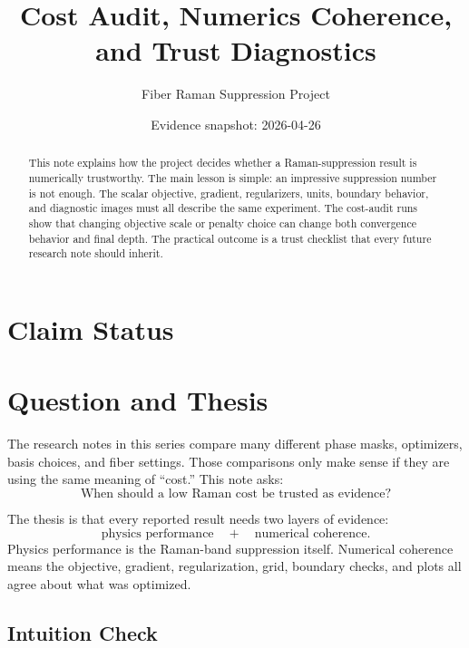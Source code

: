 \documentclass[11pt]{article}
\title{Cost Audit, Numerics Coherence, and Trust Diagnostics}
\author{Fiber Raman Suppression Project}
\date{Evidence snapshot: 2026-04-26}
\begin{document}
\maketitle

\begin{abstract}
This note explains how the project decides whether a Raman-suppression result
is numerically trustworthy. The main lesson is simple: an impressive
suppression number is not enough. The scalar objective, gradient, regularizers,
units, boundary behavior, and diagnostic images must all describe the same
experiment. The cost-audit runs show that changing objective scale or penalty
choice can change both convergence behavior and final depth. The practical
outcome is a trust checklist that every future research note should inherit.
\end{abstract}

\section*{Claim Status}

\section{Question and Thesis}

The research notes in this series compare many different phase masks,
optimizers, basis choices, and fiber settings. Those comparisons only make
sense if they are using the same meaning of ``cost.'' This note asks:
\[
    \text{When should a low Raman cost be trusted as evidence?}
\]

The thesis is that every reported result needs two layers of evidence:
\[
    \text{physics performance} \quad + \quad \text{numerical coherence}.
\]
Physics performance is the Raman-band suppression itself. Numerical coherence
means the objective, gradient, regularization, grid, boundary checks, and plots
all agree about what was optimized.

\subsection*{Intuition Check}
\end{document}
